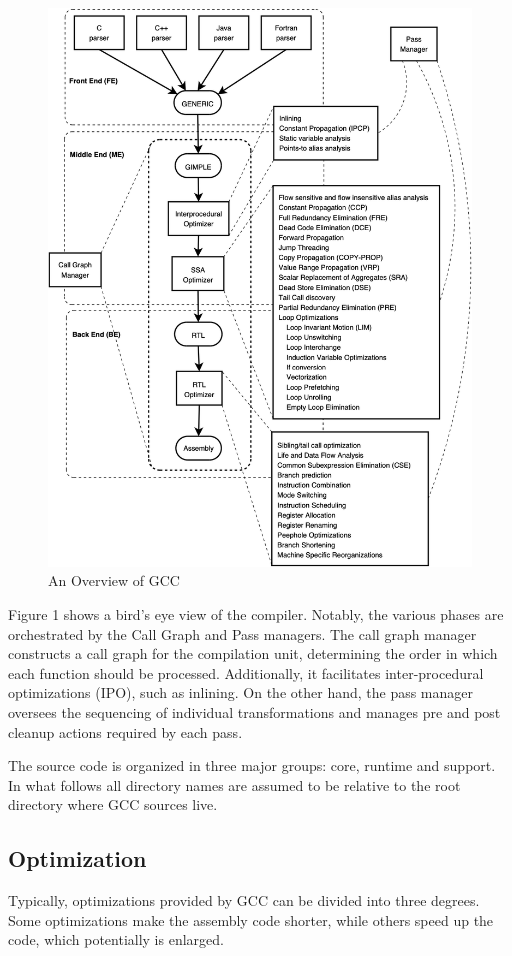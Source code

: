 \documentclass[conference]{IEEEtran}
\begin{document}
\begin{figure}[htbp]
\centering
\includegraphics [width=0.95\linewidth]{pictures/GCCoverview.png}
\caption{An Overview of GCC\cite{b1}}
\label{fig}
\end{figure}

Figure 1 shows a bird's eye view of the compiler. Notably, the various phases are orchestrated by the Call Graph and Pass managers. The call graph manager constructs a call graph for the compilation unit, determining the order in which each function should be processed. Additionally, it facilitates inter-procedural optimizations (IPO), such as inlining. On the other hand, the pass manager oversees the sequencing of individual transformations and manages pre and post cleanup actions required by each pass.

The source code is organized in three major groups: core, runtime and support. In what follows all directory names are assumed to be relative to the root directory where GCC sources live.\cite{b1}

\subsection{Optimization}
Typically, optimizations provided by GCC can be divided into three degrees. Some optimizations make the assembly code shorter, while others speed up the code, which potentially is enlarged.
\end{document}
